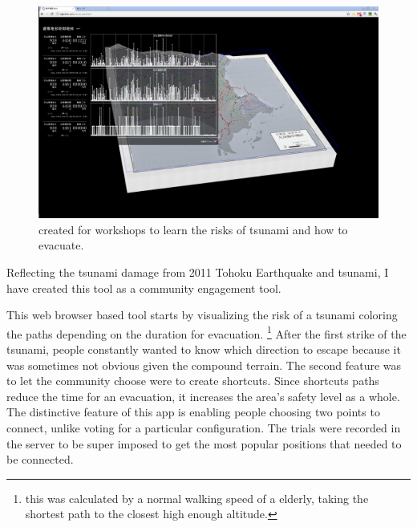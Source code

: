\begin{figure}[htb]
  \includegraphics[width=\textwidth]{chapters/3/fig/nigechizu002.png}               
  \caption[nigechizu]{ created
  for workshops to learn the risks of tsunami and how to evacuate.}
  \label{fig:nigechizu}
\end{figure}

Reflecting the tsunami damage from 2011 Tohoku Earthquake and tsunami, I have created this tool as a community engagement tool.

This web browser based tool starts by visualizing the risk of a tsunami
coloring the paths depending on the duration for evacuation.
\footnote{this was calculated by a normal walking speed of a elderly, taking the shortest
path to the closest high enough altitude.}
After the first strike of the tsunami, people constantly wanted to know
which direction to escape because it was sometimes not obvious given the
compound terrain.
The second feature was to let the community choose were to create
shortcuts.
Since shortcuts paths reduce the time for an evacuation, it increases the area's safety
level as a whole. The distinctive feature of this app is enabling people
choosing two points to connect, unlike voting for a particular
configuration. The trials were recorded in the server to be super imposed
to get the most popular positions that needed to be connected.

